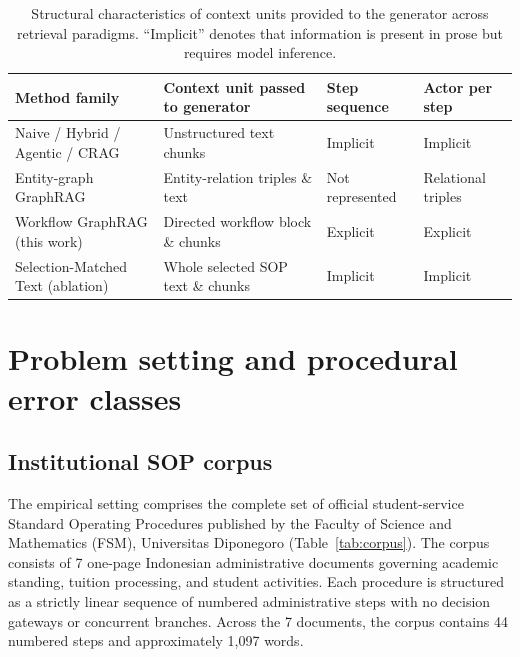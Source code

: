 \documentclass[preprint,10pt]{elsarticle}
\begin{document}
\begin{table}[!htbp]
\centering
\caption{Structural characteristics of context units provided to the generator across retrieval paradigms. ``Implicit'' denotes that information is present in prose but requires model inference.}
\label{tab:positioning}
\small
\begin{tabularx}{\textwidth}{>{\raggedright\arraybackslash}p{3.2cm} >{\raggedright\arraybackslash}X >{\raggedright\arraybackslash}p{2.1cm} >{\raggedright\arraybackslash}p{2.1cm}}
\toprule
Method family & Context unit passed to generator & Step sequence & Actor per step \\
\midrule
Naive / Hybrid / Agentic / CRAG \cite{lewis2020rag,cormack2009rrf,yao2023react,yan2024crag} & Unstructured text chunks & Implicit & Implicit \\
Entity-graph GraphRAG \cite{edge2024graphrag,guo2024lightrag} & Entity-relation triples \& text & Not represented & Relational triples \\
Workflow GraphRAG (this work) & Directed workflow block \& chunks & Explicit & Explicit \\
Selection-Matched Text (ablation) & Whole selected SOP text \& chunks & Implicit & Implicit \\
\bottomrule
\end{tabularx}
\end{table}

\section{Problem setting and procedural error classes}
\label{sec:problem}

\subsection{Institutional SOP corpus}
The empirical setting comprises the complete set of official student-service Standard Operating Procedures published by the Faculty of Science and Mathematics (FSM), Universitas Diponegoro (Table~\ref{tab:corpus}). The corpus consists of 7 one-page Indonesian administrative documents governing academic standing, tuition processing, and student activities. Each procedure is structured as a strictly linear sequence of numbered administrative steps with no decision gateways or concurrent branches. Across the 7 documents, the corpus contains 44 numbered steps and approximately 1,097 words.
\end{document}
